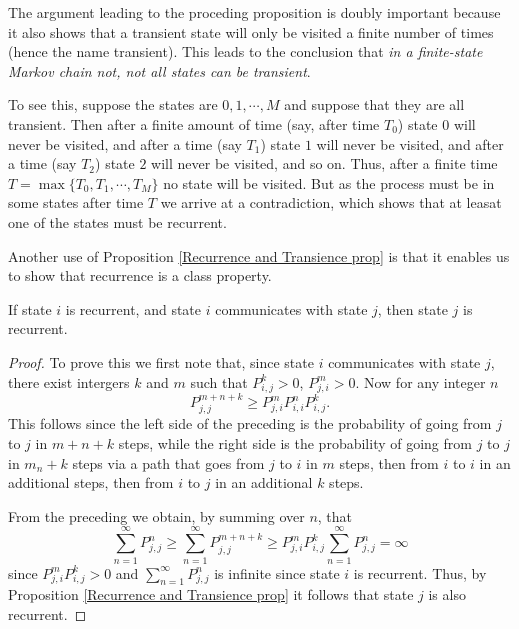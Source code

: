 The argument leading to the proceding proposition is doubly important because it also shows that a transient state will only be visited a finite number of times (hence the name transient). This leads to the conclusion that \textit{in a finite-state Markov chain not, not all states can be transient}. 

To see this, suppose the states are $0, 1, \cdots, M$ and suppose that they are all transient. Then after a finite amount of time (say, after time $T_0$) state $0$ will never be visited, and after a time (say $T_1$) state $1$ will never be visited, and after a time (say $T_2$) state $2$ will never be visited, and so on. Thus, after a finite time $T = \max \{T_0, T_1, \cdots, T_M\}$ no state will be visited. But as the process must be in some states after time $T$ we arrive at a contradiction, which shows that at leasat one of the states must be recurrent.

Another use of Proposition \ref{Recurrence and Transience prop} is that it enables us to show that recurrence is a class property.

\begin{corollary}\label{recurrence is a class property}
    If state $i$ is recurrent, and state $i$ communicates with state $j$, then state $j$ is recurrent.
    \begin{proof}
        To prove this we first note that, since state $i$ communicates with state $j$, there exist intergers $k$ and $m$ such that $P^k_{i,j} > 0$, $P^m_{j,i} > 0$. Now for any integer $n$ 
        $$
        P^{m+n+k} _{j,j} \ge P^m_{j,i} P^n_{i,i} P^k_{i,j}.
        $$
        This follows since the left side of the preceding is the probability of going from $j$ to $j$ in $m+n+k$ steps, while the right side is the probability of going from $j$ to $j$ in $m_n+k$ steps via a path that goes from $j$ to $i$ in $m$ steps, then from $i$ to $i$ in an additional steps, then from $i$ to $j$ in an additional $k$ steps.
        
        From the preceding we obtain, by summing over $n$, that 
        $$
        \sum_{n = 1}^\infty P_{j,j}^{n} \ge \sum_{n = 1}^\infty P_{j,j}^{m+n+k} \ge P^{m}_{j,i}P^k_{i,j} \sum_{n = 1}^\infty P_{j,j}^{n} = \infty 
        $$
        since $P^{m}_{j,i}P^k_{i,j} > 0$ and $\sum_{n = 1}^\infty P_{j,j}^{n} $ is infinite since state $i$ is recurrent. Thus, by Proposition \ref{Recurrence and Transience prop} it follows that state $j$ is also recurrent.
    \end{proof}
\end{corollary}

